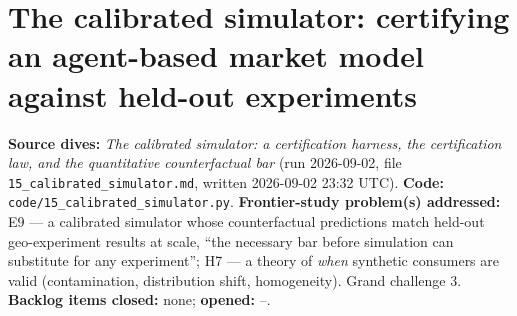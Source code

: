 \chapter[The calibrated simulator]{The calibrated simulator: certifying an agent-based market model against held-out experiments}
\label{ch:simulator}

\begin{provenance}
\textbf{Source dives:}  \emph{The calibrated simulator: a certification harness, the certification law, and the quantitative counterfactual bar} (run 2026-09-02, file \texttt{15\_calibrated\_simulator.md}, written 2026-09-02 23:32 UTC).
\textbf{Code:} \texttt{code/15\_calibrated\_simulator.py}.
\textbf{Frontier-study problem(s) addressed:} E9 --- a calibrated simulator whose counterfactual predictions match held-out geo-experiment results at scale, ``the necessary bar before simulation can substitute for any experiment''; H7 --- a theory of \emph{when} synthetic consumers are valid (contamination, distribution shift, homogeneity). Grand challenge 3.
\textbf{Backlog items closed:} none; \textbf{opened:} --.
\end{provenance}

